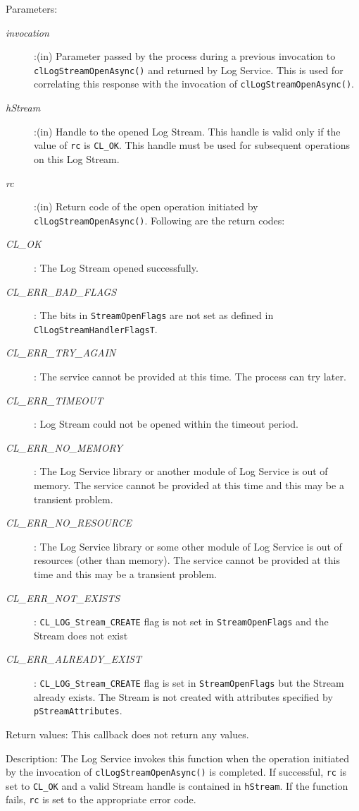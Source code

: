 \begin{flushleft}
\begin{Desc}
\item[Parameters:] 
\begin{description}
\item[{\em invocation}]:(in) Parameter passed by the process during a previous invocation to {\tt{clLogStreamOpenAsync()}} and returned by Log Service.
This is used for correlating this response with the invocation of {\tt{clLogStreamOpenAsync()}}.
\item[{\em hStream}]:(in) Handle to the opened Log Stream. This handle is valid only if the value of {\tt{rc}} is {\tt{CL\_\-OK}}. This handle
must be used for subsequent operations on this Log Stream.
\item[{\em rc}]:(in) Return code of the open operation initiated by {\tt{clLogStreamOpenAsync()}}. Following are the return codes:
\item[{\em CL\_\-OK}]: The Log Stream opened successfully.
\item[{\em CL\_\-ERR\_\-BAD\_\-FLAGS}]: The bits in {\tt{StreamOpenFlags}} are not set as defined in {\tt{ClLogStreamHandlerFlagsT}}.
\item[{\em CL\_\-ERR\_\-TRY\_\-AGAIN}]: The service cannot be provided at this time. The process can try later.
\item[{\em CL\_\-ERR\_\-TIMEOUT}]: Log Stream could not be opened within the timeout period.
\item[{\em CL\_\-ERR\_\-NO\_\-MEMORY}]: The Log Service library or another module of Log Service is out of memory. The service cannot 
be provided at this time and this may be a transient problem.
\item[{\em CL\_\-ERR\_\-NO\_\-RESOURCE}]: The Log Service library or some other module of Log Service is out of resources 
(other than memory). The service cannot be provided at this time and this may be a transient problem.
\item[{\em CL\_\-ERR\_\-NOT\_\-EXISTS}]: {\tt{CL\_\-LOG\_\-Stream\_\-CREATE}} flag is not set in {\tt{StreamOpenFlags}} and the Stream does not exist
\item[{\em CL\_\-ERR\_\-ALREADY\_\-EXIST}]: {\tt{CL\_\-LOG\_\-Stream\_\-CREATE}} flag is set in {\tt{StreamOpenFlags}} but the Stream already exists. 
The Stream is not created with attributes specified by {\tt{pStreamAttributes}}.
\end{description}
\end{Desc}

\begin{Desc}
\item[Return values:] 
This callback does not return any values.
\end{Desc}
\begin{Desc}
\item[Description:] The Log Service invokes this function when the operation initiated by the invocation of {\tt{clLogStreamOpenAsync()}} is completed.
If successful, {\tt{rc}} is set to {\tt{CL\_\-OK}} and a valid Stream handle is contained in {\tt{hStream}}. If the function fails, {\tt{rc}} is set to 
the appropriate error code.
\end{Desc}


\end{flushleft}
